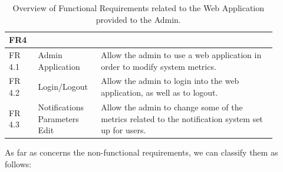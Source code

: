 \begin{table}[h!]
    \setstretch{\myspacing}
    \centering
    \begin{tabular}{|>{\raggedright\arraybackslash}p{0.1\linewidth}|>{\raggedright\arraybackslash}p{0.2\linewidth}|>{\raggedright\arraybackslash}p{0.6\linewidth}|}
        \hline
        \textbf{FR4} & \multicolumn{2}{>{\centering\arraybackslash}p{0.7\linewidth}|}{\textbf{Admin Management}} \\
        \hline
        FR 4.1 & Admin Application & Allow the admin to use a web application in order to modify system metrics. \\
        \hline
        FR 4.2 & Login/Logout & Allow the admin to login into the web application, as well as to logout. \\
        \hline
        FR 4.3 & Notifications Parameters Edit & Allow the admin to change some of the metrics related to the notification system set up for users. \\
        \hline
    \end{tabular}
    \caption{Overview of Functional Requirements related to the Web Application provided to the Admin.}
\end{table}

\clearpage

\noindent As far as concerns the non-functional requirements, we can classify them as follows:

